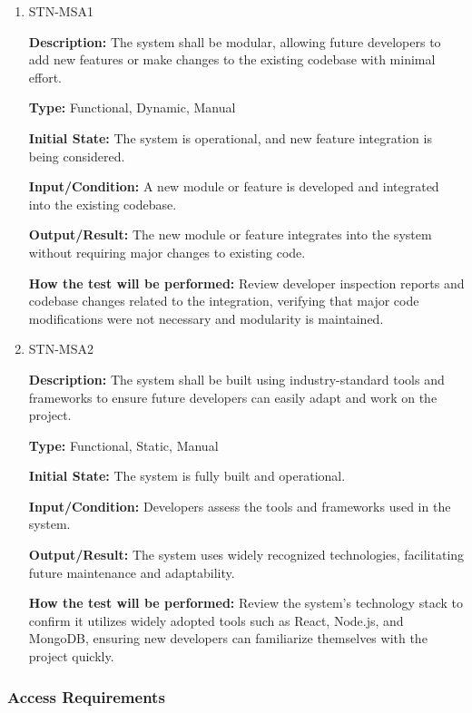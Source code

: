 \documentclass[12pt, titlepage]{article}
\begin{document}
\begin{enumerate}

\item{STN-MSA1\\}

\textbf{Description:} The system shall be modular, allowing future developers to add new features or make changes to the existing codebase with minimal effort.

\textbf{Type:} Functional, Dynamic, Manual

\textbf{Initial State:} The system is operational, and new feature integration is being considered.

\textbf{Input/Condition:} A new module or feature is developed and integrated into the existing codebase.

\textbf{Output/Result:} The new module or feature integrates into the system without requiring major changes to existing code.

\textbf{How the test will be performed:} Review developer inspection reports and codebase changes related to the integration, verifying that major code modifications were not necessary and modularity is maintained.

\item{STN-MSA2\\}

\textbf{Description:} The system shall be built using industry-standard tools and frameworks to ensure future developers can easily adapt and work on the project.

\textbf{Type:} Functional, Static, Manual

\textbf{Initial State:} The system is fully built and operational.

\textbf{Input/Condition:} Developers assess the tools and frameworks used in the system.

\textbf{Output/Result:} The system uses widely recognized technologies, facilitating future maintenance and adaptability.

\textbf{How the test will be performed:} Review the system's technology stack to confirm it utilizes widely adopted tools such as React, Node.js, and MongoDB, ensuring new developers can familiarize themselves with the project quickly.

\end{enumerate}

\subsubsection{Access Requirements}
\end{document}
